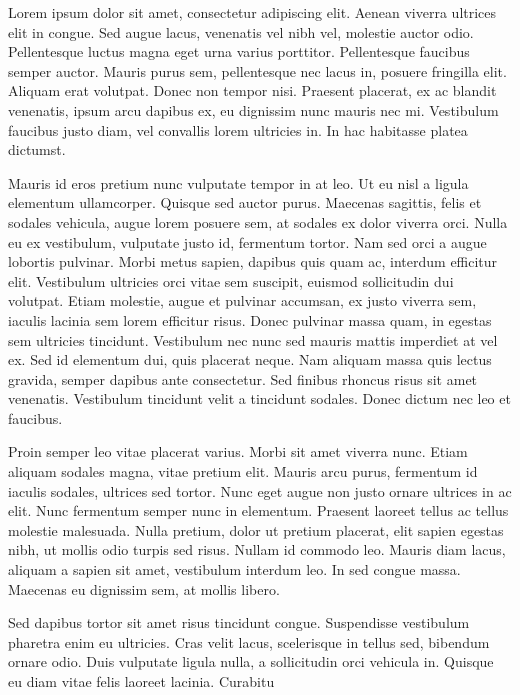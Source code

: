 \documentclass[paper=a4, fontsize=12pt, twoside, openright, titlepage=firstiscover,DIV=10]{scrbook}
\begin{document}
\newpage

Lorem ipsum dolor sit amet, consectetur adipiscing elit. Aenean viverra ultrices elit in congue. Sed augue lacus, venenatis vel nibh vel, molestie auctor odio. Pellentesque luctus magna eget urna varius porttitor. Pellentesque faucibus semper auctor. Mauris purus sem, pellentesque nec lacus in, posuere fringilla elit. Aliquam erat volutpat. Donec non tempor nisi. Praesent placerat, ex ac blandit venenatis, ipsum arcu dapibus ex, eu dignissim nunc mauris nec mi. Vestibulum faucibus justo diam, vel convallis lorem ultricies in. In hac habitasse platea dictumst.

Mauris id eros pretium nunc vulputate tempor in at leo. Ut eu nisl a ligula elementum ullamcorper. Quisque sed auctor purus. Maecenas sagittis, felis et sodales vehicula, augue lorem posuere sem, at sodales ex dolor viverra orci. Nulla eu ex vestibulum, vulputate justo id, fermentum tortor. Nam sed orci a augue lobortis pulvinar. Morbi metus sapien, dapibus quis quam ac, interdum efficitur elit. Vestibulum ultricies orci vitae sem suscipit, euismod sollicitudin dui volutpat. Etiam molestie, augue et pulvinar accumsan, ex justo viverra sem, iaculis lacinia sem lorem efficitur risus. Donec pulvinar massa quam, in egestas sem ultricies tincidunt. Vestibulum nec nunc sed mauris mattis imperdiet at vel ex. Sed id elementum dui, quis placerat neque. Nam aliquam massa quis lectus gravida, semper dapibus ante consectetur. Sed finibus rhoncus risus sit amet venenatis. Vestibulum tincidunt velit a tincidunt sodales. Donec dictum nec leo et faucibus.

Proin semper leo vitae placerat varius. Morbi sit amet viverra nunc. Etiam aliquam sodales magna, vitae pretium elit. Mauris arcu purus, fermentum id iaculis sodales, ultrices sed tortor. Nunc eget augue non justo ornare ultrices in ac elit. Nunc fermentum semper nunc in elementum. Praesent laoreet tellus ac tellus molestie malesuada. Nulla pretium, dolor ut pretium placerat, elit sapien egestas nibh, ut mollis odio turpis sed risus. Nullam id commodo leo. Mauris diam lacus, aliquam a sapien sit amet, vestibulum interdum leo. In sed congue massa. Maecenas eu dignissim sem, at mollis libero.

Sed dapibus tortor sit amet risus tincidunt congue. Suspendisse vestibulum pharetra enim eu ultricies. Cras velit lacus, scelerisque in tellus sed, bibendum ornare odio. Duis vulputate ligula nulla, a sollicitudin orci vehicula in. Quisque eu diam vitae felis laoreet lacinia. Curabitu 
\end{document}

